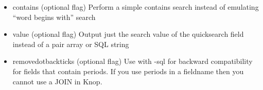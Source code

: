 \documentclass[letterpaper,10pt,english]{sphinxmanual}
\begin{document}
\begin{fulllineitems}
\begin{fulllineitems}
\begin{description}
\begin{itemize}
\item {} 
contains (optional flag)
Perform a simple contains search instead of emulating ``word begins with'' search

\item {} 
value (optional flag)
Output just the search value of the quicksearch field instead of a pair array or SQL string

\item {} 
removedotbackticks (optional flag)
Use with -sql for backward compatibility for fields that contain periods. If you use periods in a fieldname then you cannot use a JOIN in Knop.

\end{itemize}

\end{description}

\end{fulllineitems}



\begin{fulllineitems}
\end{fulllineitems}


\begin{fulllineitems}
\label{knop_grid:knop_grid.quicksearch_fields}
\end{fulllineitems}



\begin{fulllineitems}
\end{fulllineitems}


\begin{fulllineitems}
\label{knop_grid:knop_grid.quicksearch_form}
\end{fulllineitems}



\begin{fulllineitems}
\end{fulllineitems}


\begin{fulllineitems}
\label{knop_grid:knop_grid.quicksearch_form_reset}
\end{fulllineitems}




\end{fulllineitems}
\end{document}
